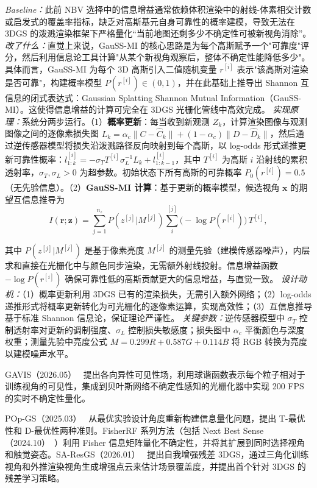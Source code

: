 \emph{Baseline：}此前 NBV 选择中的信息增益通常依赖体积渲染中的射线-体素相交计数或启发式的覆盖率指标，缺乏对高斯基元自身可靠性的概率建模，导致无法在 3DGS 的泼溅渲染框架下严格量化``当前地图还剩多少不确定性可被新视角消除''。
\emph{改了什么：}直觉上来说，GauSS-MI 的核心思路是为每个高斯赋予一个"可靠度"评分，然后利用信息论工具计算"从某个新视角观察后，整体不确定性能降低多少"。具体而言，GauSS-MI 为每个 3D 高斯引入二值随机变量 $r^{[i]}$ 表示"该高斯对渲染是否可靠"，构建概率模型 $P(r^{[i]})\in(0,1)$，并在此基础上推导出 Shannon 互信息的闭式表达式：Gaussian Splatting Shannon Mutual Information（GauSS-MI）。这使得信息增益的计算可完全在 3DGS 光栅化管线中高效完成。
\emph{实现原理：}系统分两步运行。（1）\textbf{概率更新}：每当收到新观测 $Z_k$，计算渲染图像与观测图像之间的逐像素损失图 $L_k = \alpha_c\|C-\hat{C}_k\| + (1-\alpha_c)\|D-\hat{D}_k\|$，然后通过逆传感器模型将损失沿泼溅路径反向映射到每个高斯，以 log-odds 形式递推更新可靠性概率：$l_{1:k}^{[i]} = -\sigma_T T^{[i]}\sigma_L^{-1} L_k + l_{1:k-1}^{[i]}$，其中 $T^{[i]}$ 为高斯 $i$ 沿射线的累积透射率，$\sigma_T,\sigma_L > 0$ 为超参数。初始状态下所有高斯的可靠概率 $P_0(r^{[i]})=0.5$（无先验信息）。（2）\textbf{GauSS-MI 计算}：基于更新的概率模型，候选视角 $\mathbf{x}$ 的期望互信息推导为
\begin{equation*}
I(\mathbf{r};\mathbf{z}) = \sum_{j=1}^{n_z} P(z^{[j]}|M^{[j]}) \sum_{i}^{[j]} \bigl(-\log P(r^{[i]})\bigr)\,T^{[i]},
\end{equation*}

其中 $P(z^{[j]}|M^{[j]})$ 是基于像素亮度 $M^{[j]}$ 的测量先验（建模传感器噪声），内层求和直接在光栅化中与颜色同步渲染，无需额外射线投射。信息增益函数 $-\log P(r^{[i]})$ 确保可靠性低的高斯贡献更大的信息增益，与直觉一致。
\emph{设计动机：}（1）概率更新利用 3DGS 已有的渲染损失，无需引入额外网络；（2）log-odds 递推形式将概率更新转化为可光栅化的逐像素运算，实现高效性；（3）互信息推导基于标准 Shannon 信息论，保证理论严谨性。
\emph{关键参数：}逆传感器模型中 $\sigma_T$ 控制透射率对更新的调制强度、$\sigma_L$ 控制损失敏感度；损失图中 $\alpha_c$ 平衡颜色与深度权重；测量先验中亮度公式 $M = 0.299R + 0.587G + 0.114B$ 将 RGB 转换为亮度以建模噪声水平。

GAVIS（2026.05）~\cite{2605_30342} 提出各向异性可见性场，利用球谐函数表示每个粒子相对于训练视角的可见性，集成到贝叶斯网络不确定性感知的光栅化器中实现 200 FPS 的实时不确定性量化。

POp-GS（2025.03）~\cite{2503_07819} 从最优实验设计角度重新构建信息量化问题，提出 T-最优性和 D-最优性两种准则。FisherRF 系列方法（包括 Next Best Sense（2024.10）~\cite{2410_04680}）利用 Fisher 信息矩阵量化不确定性，并将其扩展到同时选择视角和触觉姿态。SA-ResGS（2026.01）~\cite{2601_03024} 提出自我增强残差 3DGS，通过三角化训练视角和外推渲染视角生成增强点云来估计场景覆盖度，并提出首个针对 3DGS 的残差学习策略。

